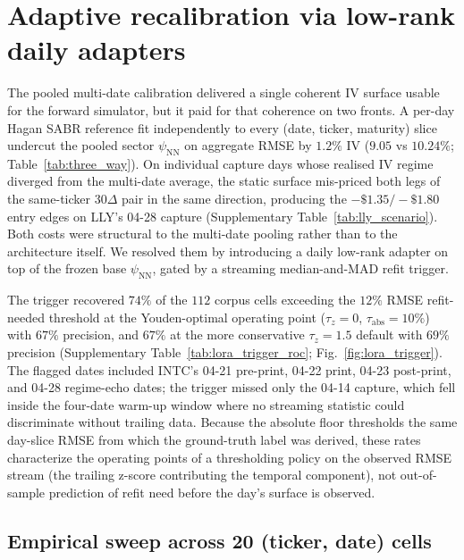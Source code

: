 \section{Adaptive recalibration via low-rank daily adapters}\label{sec:adaptive}

The pooled multi-date calibration delivered a single coherent IV surface usable for the forward simulator, but it paid for that coherence on two fronts. A per-day Hagan SABR reference fit independently to every (date, ticker, maturity) slice undercut the pooled sector $\psi_{\text{NN}}$ on aggregate RMSE by $1.2\%$ IV ($9.05$ vs $10.24\%$; Table~\ref{tab:three_way}). On individual capture days whose realised IV regime diverged from the multi-date average, the static surface mis-priced both legs of the same-ticker $30\Delta$ pair in the same direction, producing the $-\$1.35/-\$1.80$ entry edges on LLY's 04-28 capture (Supplementary Table~\ref{tab:lly_scenario}). Both costs were structural to the multi-date pooling rather than to the architecture itself. We resolved them by introducing a daily low-rank adapter on top of the frozen base $\psi_{\text{NN}}$, gated by a streaming median-and-MAD refit trigger.

The trigger recovered $74\%$ of the $112$ corpus cells exceeding the $12\%$ RMSE refit-needed threshold at the Youden-optimal operating point ($\tau_z = 0$, $\tau_{\text{abs}} = 10\%$) with $67\%$ precision, and $67\%$ at the more conservative $\tau_z = 1.5$ default with $69\%$ precision (Supplementary Table~\ref{tab:lora_trigger_roc}; Fig.~\ref{fig:lora_trigger}). The flagged dates included INTC's 04-21 pre-print, 04-22 print, 04-23 post-print, and 04-28 regime-echo dates; the trigger missed only the 04-14 capture, which fell inside the four-date warm-up window where no streaming statistic could discriminate without trailing data. Because the absolute floor thresholds the same day-slice RMSE from which the ground-truth label was derived, these rates characterize the operating points of a thresholding policy on the observed RMSE stream (the trailing z-score contributing the temporal component), not out-of-sample prediction of refit need before the day's surface is observed.

\subsection{Empirical sweep across 20 (ticker, date) cells}\label{sec:lora_sweep}

